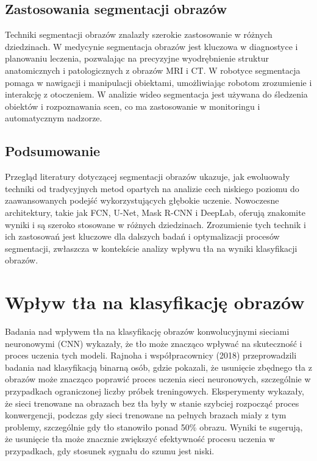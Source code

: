 \subsection*{Zastosowania segmentacji obrazów}

Techniki segmentacji obrazów znalazły szerokie zastosowanie w różnych dziedzinach. 
W medycynie segmentacja obrazów jest kluczowa w diagnostyce i planowaniu leczenia, 
pozwalając na precyzyjne wyodrębnienie struktur anatomicznych i patologicznych z obrazów MRI i CT. 
W robotyce segmentacja pomaga w nawigacji i manipulacji obiektami, umożliwiając robotom 
zrozumienie i interakcję z otoczeniem. W analizie wideo segmentacja jest używana do śledzenia 
obiektów i rozpoznawania scen, co ma zastosowanie w monitoringu i automatycznym nadzorze.

\subsection*{Podsumowanie}

Przegląd literatury dotyczącej segmentacji obrazów ukazuje, jak ewoluowały techniki od tradycyjnych 
metod opartych na analizie cech niskiego poziomu do zaawansowanych podejść wykorzystujących głębokie 
uczenie. Nowoczesne architektury, takie jak FCN, U-Net, Mask R-CNN i DeepLab, oferują znakomite wyniki 
i są szeroko stosowane w różnych dziedzinach. Zrozumienie tych technik i ich zastosowań jest kluczowe 
dla dalszych badań i optymalizacji procesów segmentacji, zwłaszcza w kontekście analizy wpływu tła na 
wyniki klasyfikacji obrazów.


\section*{Wpływ tła na klasyfikację obrazów}

Badania nad wpływem tła na klasyfikację obrazów konwolucyjnymi sieciami neuronowymi (CNN) wykazały, 
że tło może znacząco wpływać na skuteczność i proces uczenia tych modeli. Rajnoha i współpracownicy 
(2018) przeprowadzili badania nad klasyfikacją binarną osób, gdzie pokazali, że usunięcie zbędnego 
tła z obrazów może znacząco poprawić proces uczenia sieci neuronowych, szczególnie w przypadkach 
ograniczonej liczby próbek treningowych. Eksperymenty wykazały, że sieci trenowane na obrazach bez 
tła były w stanie szybciej rozpocząć proces konwergencji, podczas gdy sieci trenowane na pełnych 
brazach miały z tym problemy, szczególnie gdy tło stanowiło ponad 50\% obrazu. Wyniki te sugerują, 
że usunięcie tła może znacznie zwiększyć efektywność procesu uczenia w przypadkach, gdy stosunek 
sygnału do szumu jest niski.

